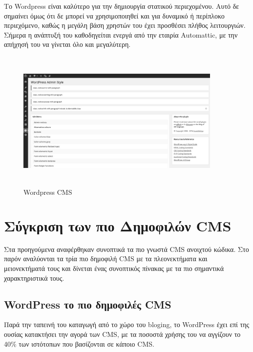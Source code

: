 \documentclass[12pt]{report}
\begin{document}
Το \textlatin{Wordpress} είναι καλύτερο για την δημιουργία στατικού περιεχομένου. Αυτό δε σημαίνει όμως ότι δε μπορεί να χρησιμοποιηθεί και για δυναμικό ή περίπλοκο περιεχόμενο, καθώς η μεγάλη βάση χρηστών του έχει προσθέσει πλήθος λειτουργιών. Σήμερα η ανάπτυξή του καθοδηγείται ενεργά από την εταιρία \textlatin{Automattic}, με την απήχησή του να γίνεται όλο και μεγαλύτερη.
\begin{figure}[H]
\centering
\includegraphics[width=0.9\textwidth, height=7cm]{wordpress-gray}
\caption{\textlatin{Wordpress CMS}}
\label{fig:wordpress}
\end{figure}

\section{Σύγκριση των πιο Δημοφιλών \textlatin{CMS}}
Στα προηγούμενα αναφέρθηκαν συνοπτικά τα πιο γνωστά \textlatin{CMS} ανοιχτού κώδικα. Στο παρόν αναλύονται τα τρία πιο δημοφιλή \textlatin{CMS} με τα πλεονεκτήματα και μειονεκτήματά τους και δίνεται ένας συνοπτικός πίνακας με τα πιο σημαντικά χαρακτηριστικά τους.

\subsection{\textlatin{WordPress} το πιο δημοφιλές \textlatin{CMS}}
Παρά την ταπεινή του καταγωγή από το χώρο του \textlatin{bloging}, το \textlatin{WordPress} έχει επί της ουσίας κατακτήσει την αγορά των \textlatin{CMS}, με τα ποσοστά χρήσης του να αγγίζουν το 40\% των ιστότοπων που βασίζονται σε κάποιο \textlatin{CMS}.
\end{document}
